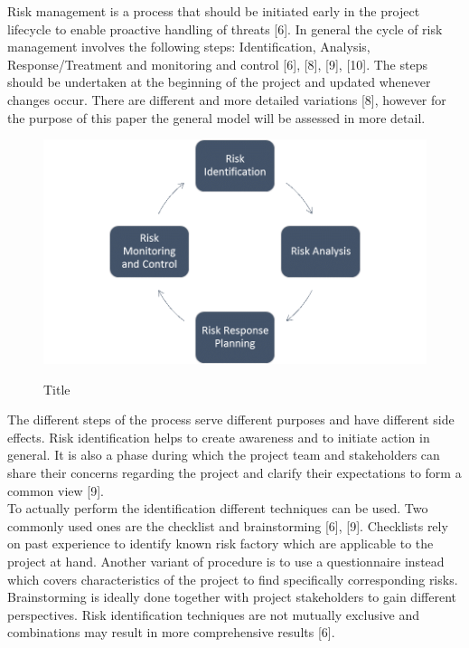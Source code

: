 Risk management is a process that should be initiated early in the project lifecycle to enable proactive handling of threats [6]. In general the cycle of risk management involves the following steps: Identification, Analysis, Response/Treatment and monitoring and control [6], [8], [9], [10]. The steps should be undertaken at the beginning of the project and updated whenever changes occur. There are different and more detailed variations [8], however for the purpose of this paper the general model will be assessed in more detail. \\

\begin{figure}[htbp] 
	\centering
	\includegraphics[width=1.0\textwidth]{Content/Theory/RiskManagementCycle.png}
	\caption{Title}
	\cite{bibkey}
	\label{fig:riskmanagmentcycle}
\end{figure}

The different steps of the process serve different purposes and have different side effects. Risk identification helps to create awareness and to initiate action in general. It is also a phase during which the project team and stakeholders can share their concerns regarding the project and clarify their expectations to form a common view [9].\\

To actually perform the identification different techniques can be used. Two commonly used ones are the checklist and brainstorming [6], [9]. Checklists rely on past experience to identify known risk factory which are applicable to the project at hand. Another variant of procedure is to use a questionnaire instead which covers characteristics of the project to find specifically corresponding risks. Brainstorming is ideally done together with project stakeholders to gain different perspectives. Risk identification techniques are not mutually exclusive and combinations may result in more comprehensive results [6].\\

